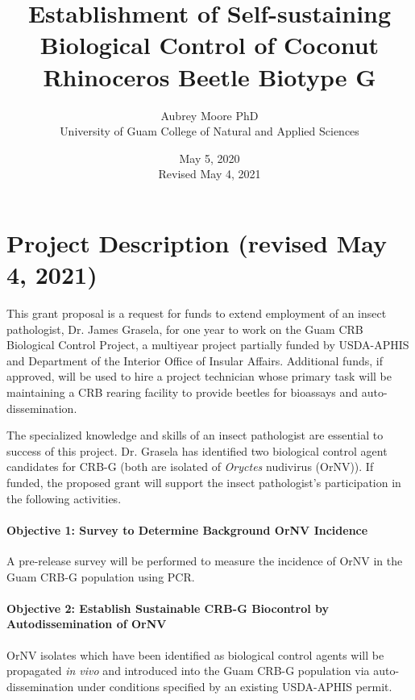 \documentclass[12pt,letterpaper,english,bibliography=totocnumbered, abstract=on]{scrartcl}
\begin{document}
\titlehead{Grant Proposal: USDA Forest Service FY2020}

\title{Establishment of Self-sustaining Biological Control of Coconut Rhinoceros Beetle Biotype G}

\author{Aubrey Moore PhD\\University of Guam College of Natural and Applied Sciences}

\date{May 5, 2020\\Revised May 4, 2021}

\maketitle
\newpage
\tableofcontents

\pagebreak

\section{Project Description (revised May 4, 2021)}

This grant proposal is a request for funds to extend employment of an insect pathologist,
Dr. James Grasela, for one year to work on the Guam CRB Biological Control Project, a multiyear project partially funded by
USDA-APHIS and Department of the Interior Office of Insular Affairs. Additional funds, if approved, will be used to hire a project technician whose primary task will be maintaining a CRB rearing facility to provide beetles for bioassays and auto-dissemination.

The specialized knowledge and skills of an insect pathologist are essential to success of this project. 
Dr. Grasela has identified two biological control agent candidates for CRB-G (both are isolated of \textit{Oryctes} nudivirus (OrNV)).
If funded, the proposed grant will support the insect pathologist's participation in the following activities.

\paragraph{Objective 1: Survey to Determine Background OrNV Incidence} 
A pre-release survey will be performed to measure the incidence of OrNV in the Guam CRB-G population using PCR.

\paragraph{Objective 2: Establish Sustainable CRB-G Biocontrol by Autodissemination of OrNV}
OrNV isolates which have been identified as biological control agents will be propagated \textit{in vivo} and
introduced into the Guam CRB-G population via auto-dissemination under conditions specified by an existing USDA-APHIS permit.
\end{document}
